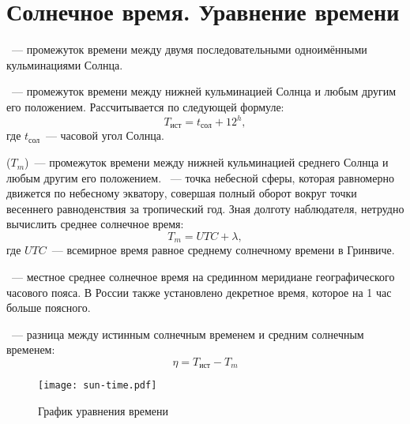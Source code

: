 \section{Солнечное время. Уравнение времени}
~--- промежуток времени между двумя последовательными одноимёнными кульминациями Солнца.

~--- промежуток времени между нижней кульминацией Солнца и любым другим его положением. Рассчитывается по следующей формуле:
\begin{equation}
T_{\text{ист}}=t_{\text{сол}}+12^h,
\end{equation}
где $t_{\text{сол}}$~--- часовой угол Солнца.

 ($T_m$)~--- промежуток времени между нижней кульминацией среднего Солнца и любым другим его положением. ~--- точка небесной сферы, которая равномерно движется по небесному экватору, совершая полный оборот вокруг точки весеннего равноденствия за тропический год. Зная долготу наблюдателя, нетрудно вычислить среднее солнечное время:
\begin{equation}
T_m=UTC+\lambda,
\end{equation}
где $UTC$~--- всемирное время равное среднему солнечному времени в Гринвиче.

~--- местное среднее солнечное время на срединном меридиане географического часового пояса. В России также установлено декретное время, которое на 1 час больше поясного.


~--- разница между истинным солнечным временем и средним солнечным временем:
\begin{equation}
\eta=T_{\text{ист}}-T_m
\end{equation}

\centering
 \begin{figure}[!h]
  \centering
  \texttt{[image: sun-time.pdf]}
  \caption{График уравнения времени}
 \end{figure}